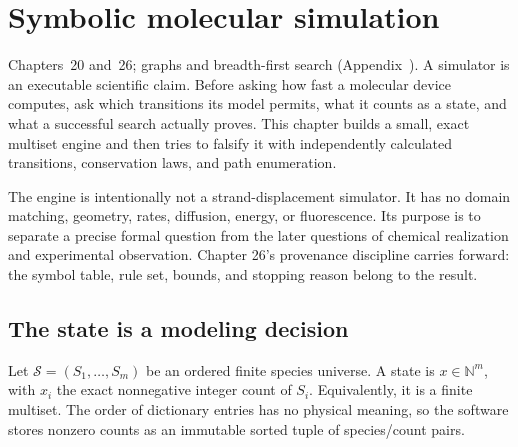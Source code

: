 \chapter{Symbolic molecular simulation}
{Chapters~20 and~26; graphs and breadth-first search (Appendix~).}
A simulator is an executable scientific claim. Before asking how fast a molecular
device computes, ask which transitions its model permits, what it counts as a
state, and what a successful search actually proves. This chapter builds a small,
exact multiset engine and then tries to falsify it with independently calculated
transitions, conservation laws, and path enumeration.

The engine is intentionally not a strand-displacement simulator. It has no domain
matching, geometry, rates, diffusion, energy, or fluorescence. Its purpose is to
separate a precise formal question from the later questions of chemical realization
and experimental observation. Chapter 26's provenance discipline carries forward:
the symbol table, rule set, bounds, and stopping reason belong to the result.

\section{The state is a modeling decision}
Let $\mathcal S=(S_1,\ldots,S_m)$ be an ordered finite species universe. A state is
$x\in\mathbb N^m$, with $x_i$ the exact nonnegative integer count of $S_i$.
Equivalently, it is a finite multiset. The order of dictionary entries has no
physical meaning, so the software stores nonzero counts as an immutable sorted
tuple of species/count pairs.


